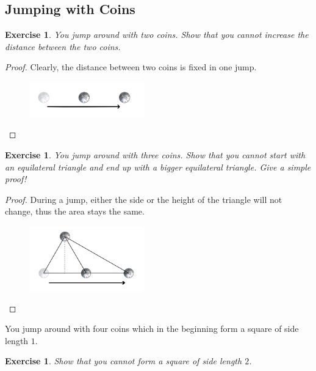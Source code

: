 \documentclass[12pt,a4]{article}
\theoremstyle{exercise}
\newtheorem{exercise}[theorem]{Exercise}
\begin{document}
\subsection{Jumping with Coins}

\begin{exercise}
    You jump around with two coins.
    Show that you cannot increase the distance between the two coins.
\end{exercise}

\begin{proof}
    Clearly, the distance between two coins is fixed in one jump.

    \begin{figure}[H]
        \small
        \centering
        \includegraphics[width=5cm]{twocoins.png}
        \label{fig:twoCoins}
    \end{figure}

\end{proof}


\begin{exercise}
    You jump around with three coins.
    Show that you cannot start with an equilateral triangle and end up with a bigger equilateral triangle.
    Give a simple proof!
\end{exercise}

\begin{proof}
    During a jump, either the side or the height of the triangle will not change, thus the area stays the same.

    \begin{figure}[H]
        \small
        \centering
        \includegraphics[width=5cm]{threecoins.png}
        \label{fig:threeCoins}
    \end{figure}

\end{proof}

You jump around with four coins which in the beginning form a square of side length $1$.

\begin{exercise}
    Show that you cannot form a square of side length $2$.
\end{exercise}
\end{document}
